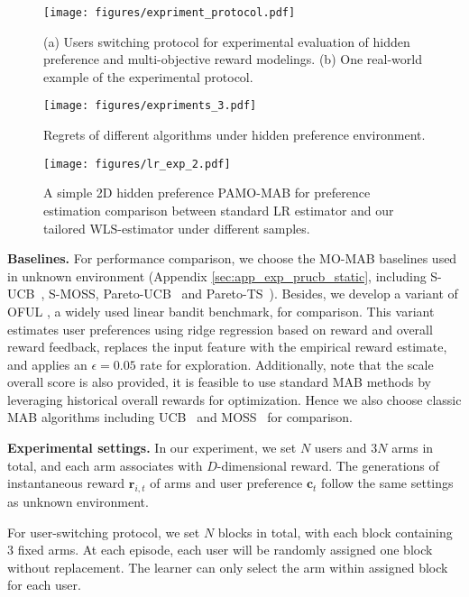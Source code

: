 \begin{figure*}[t]
    \centering    
    \texttt{[image: figures/expriment\_protocol.pdf]}
    \caption{(a) Users switching protocol for experimental evaluation of hidden preference and multi-objective reward modelings. (b) One real-world example of the experimental protocol.
}
    \label{fig:experiment3_protocol}
\end{figure*}

\begin{figure*}[t]
    \centering    
    \texttt{[image: figures/expriments\_3.pdf]}
    \caption{Regrets of different algorithms under hidden preference environment.
}
    \label{fig:experiment_3}
\end{figure*}


\begin{figure*}[t]
    \centering    
    \texttt{[image: figures/lr\_exp\_2.pdf]}
    \caption{A simple 2D hidden preference PAMO-MAB for preference estimation comparison between standard LR estimator and our tailored WLS-estimator under different samples.}
    \label{fig:lr_exp_2}
\end{figure*}

\textbf{Baselines.}
For performance comparison, we choose the MO-MAB baselines used in unknown environment (Appendix \ref{sec:app_exp_prucb_static}, including S-UCB~\cite{drugan2013designing}, S-MOSS, Pareto-UCB~\cite{drugan2013designing} and Pareto-TS~\cite{yahyaa2015thompson}). 
Besides, we develop a variant of OFUL \cite{abbasi2011improved}, a widely used linear bandit benchmark, for comparison. This variant estimates user preferences using ridge regression based on reward and overall reward feedback, replaces the input feature with the empirical reward estimate, and applies an $\epsilon = 0.05$ rate for exploration.
Additionally, note that the scale overall score is also provided, it is feasible to use standard MAB methods by leveraging historical overall rewards for optimization. Hence we also choose classic MAB algorithms including UCB~\cite{auer2002finite} and MOSS~\cite{audibert2009minimax} for comparison.

\textbf{Experimental settings.}
In our experiment, we set $N$ users and $3N$ arms in total, and each arm associates with $D$-dimensional reward. The generations of instantaneous reward $\boldsymbol{r}_{i,t}$ of arms and user preference $\boldsymbol{c}_{t}$ follow the same settings as unknown environment.  

For user-switching protocol, we set $N$ blocks in total, with each block containing 3 fixed arms. At each episode, each user will be randomly assigned one block without replacement. The learner can only select the arm within assigned block for each user. 

